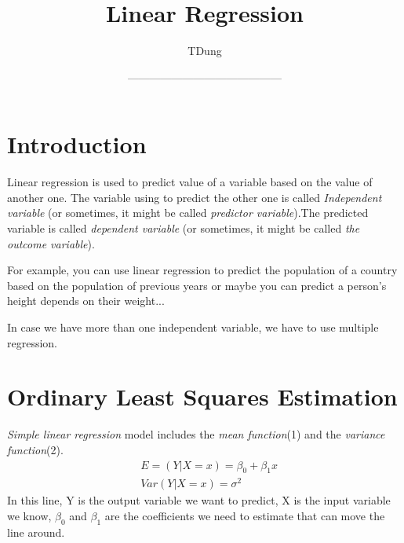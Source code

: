 \documentclass{article}
\title{Linear Regression}
\author{TDung}
\date{------------------------------------------}
\begin{document}
\tableofcontents

\maketitle
\section{Introduction}
    \begin{center}
    \end{center}
	Linear regression is used to predict value of a variable based on the value of another one. The variable using to predict the other one is called \textit{Independent variable} (or sometimes, it might be called \textit{predictor variable}).The predicted variable is called \textit{dependent variable} (or sometimes, it might be called \textit{the outcome variable}).
	
    For example, you can use linear regression to predict the population of a country based on the population of previous years or maybe you can predict a person's height depends on their weight...
    
    In case we have more than one independent variable, we have to use multiple regression.
    
\section{Ordinary Least Squares Estimation} 
	\textit{Simple linear regression} model includes the \textit{mean function}(1) and the \textit{variance function}(2). 
	\begin{align}
            &E = (Y|X=x) = \beta _{0} + \beta _{1} x \\
            &Var(Y|X=x) = \sigma ^ {2}
    \end{align}
    In this line, Y is the output variable we want to predict, X is the input variable we know, $\beta_{0}$ and $\beta_{1}$ are the coefficients we need to estimate that can move the line around.
    
\end{document}
